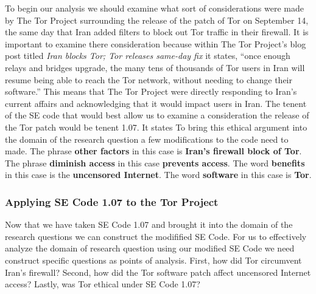 \documentclass[11pt]{article}
\begin{document}
\begin{multicols}{2}
To begin our analysis we should examine what sort of considerations were made by
The Tor Project surrounding the release of the patch of Tor on September 14, the
same day that Iran added filters to block out Tor traffic in their firewall. It
is important to examine there consideration because within The Tor Project's
blog post titled \textit{Iran blocks Tor; Tor releases same-day fix} it states,
``once enough relays and bridges upgrade, the many tens of thousands of Tor
users in Iran will resume being able to reach the Tor network, without needing
to change their software.''\cite{Tor:SameDayFix} This means that The Tor Project
were directly responding to Iran's current affairs and acknowledging that it
would impact users in Iran. The tenent of the SE code that would best allow us
to examine a consideration the release of the Tor patch would be tenent 1.07. It
states
\newline
{}
\newline
To bring this ethical argument into the domain of the research question a few
modifications to the code need to made. The phrase \textbf{other factors} in
this case is \textbf{Iran's firewall block of Tor}. The phrase \textbf{diminish
access} in this case \textbf{prevents access}. The word \textbf{benefits} in
this case is the \textbf{uncensored Internet}. The word \textbf{software} in
this case is \textbf{Tor}.

\subsubsection{Applying SE Code 1.07 to the Tor Project}

Now that we have taken SE Code 1.07 and brought it into the domain of the
research questions we can construct the modifified SE Code.
\newline
{}
\newline
For us to effectively analyze the domain of research question using our modified
SE Code we need construct specific questions as points of analysis. First, how
did Tor circumvent Iran's firewall?  Second, how did the Tor software patch
affect uncensored Internet access?  Lastly, was Tor ethical under SE Code 1.07?


\end{multicols}
\end{document}
